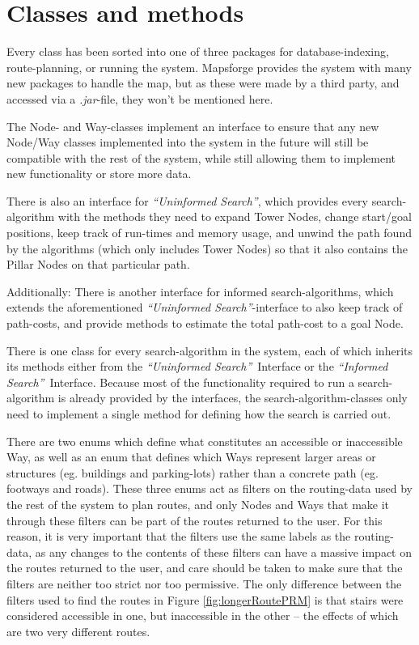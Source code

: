 \section{Classes and methods}
Every class has been sorted into one of three packages for database-indexing, route-planning, or running the system. Mapsforge provides the system with many new packages to handle the map, but as these were made by a third party, and accessed via a \textit{.jar}-file, they won't be mentioned here.

The Node- and Way-classes implement an interface to ensure that any new Node/Way classes implemented into the system in the future will still be compatible with the rest of the system, while still allowing them to implement new functionality or store more data.

There is also an interface for \textit{\textquotedblleft Uninformed Search\textquotedblright}, which provides every search-algorithm with the methods they need to expand Tower Nodes, change start/goal positions, keep track of run-times and memory usage, and unwind the path found by the algorithms (which only includes Tower Nodes) so that it also contains the Pillar Nodes on that particular path.

Additionally: There is another interface for informed search-algorithms, which extends the aforementioned \textit{\textquotedblleft Uninformed Search\textquotedblright}-interface to also keep track of path-costs, and provide methods to estimate the total path-cost to a goal Node.

There is one class for every search-algorithm in the system, each of which inherits its methods either from the \textit{\textquotedblleft Uninformed Search\textquotedblright}~Interface or the \textit{\textquotedblleft Informed Search\textquotedblright}~Interface. Because most of the functionality required to run a search-algorithm is already provided by the interfaces, the search-algorithm-classes only need to implement a single method for defining how the search is carried out.

There are two enums which define what constitutes an accessible or inaccessible Way, as well as an enum that defines which Ways represent larger areas or structures (eg. buildings and parking-lots) rather than a concrete path (eg. footways and roads). These three enums act as filters on the routing-data used by the rest of the system to plan routes, and only Nodes and Ways that make it through these filters can be part of the routes returned to the user. For this reason, it is very important that the filters use the same labels as the routing-data, as any changes to the contents of these filters can have a massive impact on the routes returned to the user, and care should be taken to make sure that the filters are neither too strict nor too permissive. The only difference between the filters used to find the routes in Figure \ref{fig:longerRoutePRM} is that stairs were considered accessible in one, but inaccessible in the other -- the effects of which are two very different routes.

